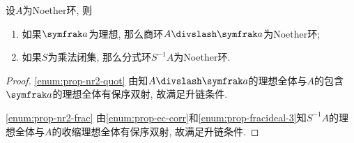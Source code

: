 



\begin{proposition}\label{prop:noetherring2}
  设$A$为Noether环, 则
  \begin{enumerate}
    \item\label{enum:prop-nr2-quot} 如果$\ideal{a}$为理想, 那么商环$A{\divslash}\ideal{a}$为Noether环;
    \item\label{enum:prop-nr2-frac} 如果$S$为乘法闭集, 那么分式环$S^{-1}A$为Noether环.
  \end{enumerate}
\end{proposition}

\begin{proof}
  \ref{enum:prop-nr2-quot} 由知$A{\divslash}\ideal{a}$的理想全体与$A$的包含$\ideal{a}$的理想全体有保序双射, 故满足升链条件.

  \ref{enum:prop-nr2-frac} 由\ref{enum:prop-ec-corr}和\ref{enum:prop-fracideal-3}知$S^{-1}A$的理想全体与$A$的收缩理想全体有保序双射, 故满足升链条件.
\end{proof}

